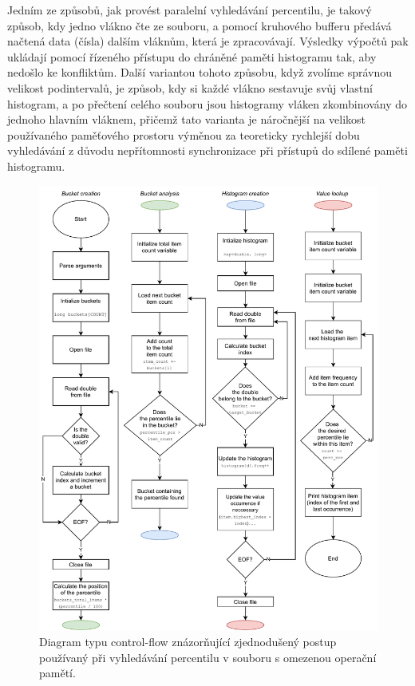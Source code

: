 \documentclass[12pt, a4paper]{article}
\begin{document}
Jedním ze způsobů, jak provést paralelní vyhledávání percentilu, je takový způsob, kdy jedno vlákno čte ze souboru, a pomocí kruhového bufferu předává načtená data (čísla) dalším vláknům, která je zpracovávají. Výsledky výpočtů pak ukládají pomocí řízeného přístupu do chráněné paměti histogramu tak, aby nedošlo ke konfliktům. 
Další variantou tohoto způsobu, když zvolíme správnou velikost podintervalů, je způsob, kdy si každé vlákno sestavuje svůj vlastní histogram, a po přečtení celého souboru jsou histogramy vláken zkombinovány do jednoho hlavním vláknem, přičemž tato varianta je náročnější na velikost používaného paměťového prostoru výměnou za teoreticky rychlejší dobu vyhledávání z důvodu nepřítomnosti synchronizace při přístupů do sdílené paměti histogramu.

\begin{figure}[!ht]
    \centering 
    \includegraphics[width=1.038125\textwidth]{pdf/cfd.pdf}
    \caption{Diagram typu control-flow znázorňující zjednodušený postup používaný při vyhledávání percentilu v souboru s omezenou operační pamětí.}
\end{figure}
\end{document}
